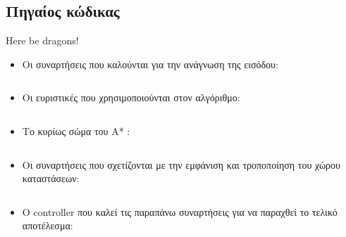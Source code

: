 \documentclass[a4paper,12pt]{article}
\begin{document}
\subsection{Πηγαίος κώδικας}
Here be dragons!
\begin{itemize}
\item
Οι συναρτήσεις που καλούνται για την ανάγνωση της εισόδου:
\inputminted[linenos]{c}{../../Programs/roboLab/inparser.py}

\item
Οι ευριστικές που χρησιμοποιούνται στον αλγόριθμο:
\inputminted[linenos]{c}{../../Programs/roboLab/heuristics.py}

\item
Το κυρίως σώμα του A* :
\inputminted[linenos]{c}{../../Programs/roboLab/astar.py}

\item
Οι συναρτήσεις που σχετίζονται με την εμφάνιση και τροποποίηση του χώρου
καταστάσεων:
\inputminted[linenos]{c}{../../Programs/roboLab/grids.py}

\item
Ο controller που καλεί τις παραπάνω συναρτήσεις για να παραχθεί το τελικό
αποτέλεσμα:
\inputminted[linenos]{c}{../../Programs/roboLab/controller.py}
\end{itemize}
\end{document}

